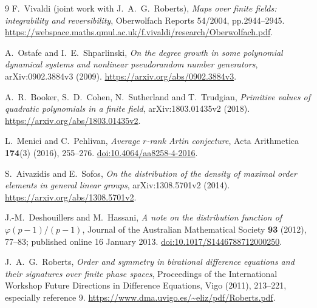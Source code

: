 \documentclass[11pt]{article}
\theoremstyle{remark}
\begin{document}
\begin{thebibliography}{9}
 F.~Vivaldi (joint work with J.~A.~G.~Roberts),
\emph{Maps over finite fields: integrability and reversibility},
Oberwolfach Reports 54/2004, pp.2944--2945.
\url{https://webspace.maths.qmul.ac.uk/f.vivaldi/research/Oberwolfach.pdf}.

 A.~Ostafe and I.~E.~Shparlinski,
\emph{On the degree growth in some polynomial dynamical systems and
nonlinear pseudorandom number generators}, arXiv:0902.3884v3 (2009).
\url{https://arxiv.org/abs/0902.3884v3}.

 A.~R.~Booker, S.~D.~Cohen, N.~Sutherland and T.~Trudgian,
\emph{Primitive values of quadratic polynomials in a finite field},
arXiv:1803.01435v2 (2018).
\url{https://arxiv.org/abs/1803.01435v2}.

 L.~Menici and C.~Pehlivan,
\emph{Average $r$-rank Artin conjecture}, Acta Arithmetica
\textbf{174}(3) (2016), 255--276.
\href{https://doi.org/10.4064/aa8258-4-2016}{doi:10.4064/aa8258-4-2016}.

 S.~Aivazidis and E.~Sofos,
\emph{On the distribution of the density of maximal order elements in
general linear groups}, arXiv:1308.5701v2 (2014).
\url{https://arxiv.org/abs/1308.5701v2}.

 J.-M.~Deshouillers and M.~Hassani,
\emph{A note on the distribution function of $\varphi(p-1)/(p-1)$},
Journal of the Australian Mathematical Society \textbf{93} (2012),
77--83; published online 16 January 2013.
\href{https://doi.org/10.1017/S1446788712000250}{doi:10.1017/S1446788712000250}.

 J.~A.~G.~Roberts,
\emph{Order and symmetry in birational difference equations and their
signatures over finite phase spaces}, Proceedings of the International
Workshop Future Directions in Difference Equations, Vigo (2011),
213--221, especially reference 9.
\url{https://www.dma.uvigo.es/~eliz/pdf/Roberts.pdf}.
\end{thebibliography}
\end{document}

